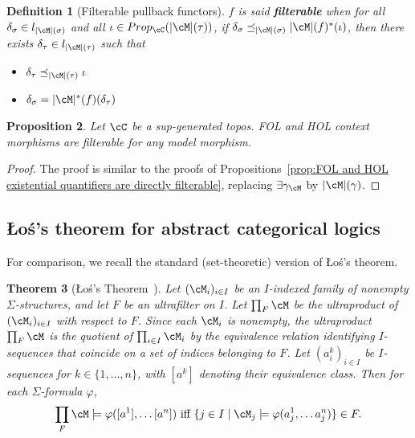 \documentclass[preprint,3p,times]{elsarticle}
\newtheorem{definition}{Definition}[section]
\newtheorem{proposition}[definition]{Proposition}
\newtheorem{theorem}[definition]{Theorem}
\newcommand{\Los}{\L{}o{\'s}}
\newcommand{\set}[1]{\{#1\}}                                %
\begin{document}
\begin{definition}[Filterable pullback functors]

$f$ is said {\bf filterable} when for all $\delta_\sigma \in l_{|\cM|(\sigma)}$ and all $\iota \in Prop_\cC(|\cM|(\tau))$, if $\delta_\sigma \preceq_{|\cM|(\sigma)} |\cM|(f)^*(\iota)$, then there exists $\delta_\tau \in l_{|\cM|(\tau)}$ such that
\begin{itemize}
    \item $\delta_\tau \preceq_{|\cM|(\tau)} \iota$
    \item $\delta_\sigma = |\cM|^*(f)(\delta_\tau)$
\end{itemize}
\end{definition}

\begin{proposition}
Let $\cC$ be a sup-generated topos. FOL and HOL context morphisms are filterable for any model morphism. 
\end{proposition}

\begin{proof}
The proof is similar to the proofs of Propositions~\ref{prop:FOL and HOL existential quantifiers are directly filterable}, replacing
\(\exists \gamma_\cM\)
by
\(|\cM|(\gamma)\).

\end{proof}

\subsection{\Los's theorem for abstract categorical logics}
\label{subsec:los:theorem}

For comparison, we recall the standard (set-theoretic) version of \Los's theorem.

\begin{theorem}[\Los's Theorem~\cite{los_quelques_1955}]
\label{th:Los:set-theory}
Let \((\cM_i)_{i\in I}\) be an \(I\)-indexed family of nonempty \(\Sigma\)-structures, and let \(F\) be an ultrafilter on \(I\). Let \(\prod_F \cM\) be the ultraproduct of \((\cM_i)_{i\in I}\) with respect to \(F\). Since each \(\cM_i\) is nonempty, the ultraproduct \(\prod_F \cM\) is the quotient of \(\prod_{i \in I} \cM_i\) by the equivalence relation identifying \(I\)-sequences that coincide on a set of indices belonging to \(F\). Let \((a^k_i)_{i \in I}\) be \(I\)-sequences for \(k \in \set{1, \ldots, n}\), with \([a^k]\) denoting their equivalence class. Then for each \(\Sigma\)-formula \(\varphi\),
\[
    \prod_F \cM \models \varphi([a^1], \ldots [a^n]) ~\mbox{iff}~ \set{j \in I \mid \cM_j \models \varphi(a^1_j, \ldots a^n_j)} \in F.
\]
\end{theorem}
\end{document}
